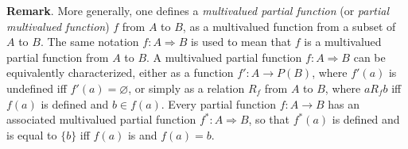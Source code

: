 \documentclass[12pt]{article}
\begin{document}
\textbf{Remark}.  More generally, one defines a \emph{multivalued partial function} (or \emph{partial multivalued function}) $f$ from $A$ to $B$, as a multivalued function from a subset of $A$ to $B$.  The same notation $f:A\Rightarrow B$ is used to mean that $f$ is a multivalued partial function from $A$ to $B$.  A multivalued partial function $f:A\Rightarrow B$ can be equivalently characterized, either as a function $f':A \to P(B)$, where $f'(a)$ is undefined iff $f'(a)=\varnothing$, or simply as a relation $R_f$ from $A$ to $B$, where $a R_f b$ iff $f(a)$ is defined and $b\in f(a)$.  Every partial function $f:A\to B$ has an associated multivalued partial function $f^*:A\Rightarrow B$, so that $f^*(a)$ is defined and is equal to $\lbrace b\rbrace$ iff $f(a)$ is and $f(a)=b$.
\end{document}
